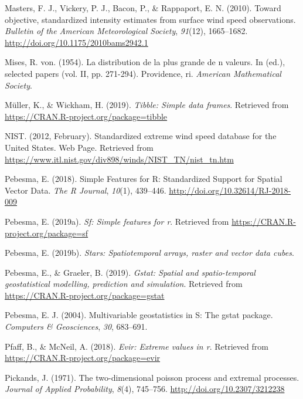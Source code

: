 \documentclass[12pt,oneside]{reedthesis}
\begin{document}
\leavevmode\hypertarget{ref-Masters2010}{}%
Masters, F. J., Vickery, P. J., Bacon, P., \& Rappaport, E. N. (2010). Toward objective, standardized intensity estimates from surface wind speed observations. \emph{Bulletin of the American Meteorological Society}, \emph{91}(12), 1665--1682. \url{http://doi.org/10.1175/2010bams2942.1}

\leavevmode\hypertarget{ref-Mises1954}{}%
Mises, R. von. (1954). La distribution de la plus grande de n valeurs. In (ed.), selected papers (vol. II, pp. 271-294). Providence, ri. \emph{American Mathematical Society}.

\leavevmode\hypertarget{ref-Mueller2019}{}%
Müller, K., \& Wickham, H. (2019). \emph{Tibble: Simple data frames}. Retrieved from \url{https://CRAN.R-project.org/package=tibble}

\leavevmode\hypertarget{ref-nist2012}{}%
NIST. (2012, February). Standardized extreme wind speed database for the United States. Web Page. Retrieved from \url{https://www.itl.nist.gov/div898/winds/NIST_TN/nist_tn.htm}

\leavevmode\hypertarget{ref-Pebesma2018}{}%
Pebesma, E. (2018). Simple Features for R: Standardized Support for Spatial Vector Data. \emph{The R Journal}, \emph{10}(1), 439--446. \url{http://doi.org/10.32614/RJ-2018-009}

\leavevmode\hypertarget{ref-Pebesma2019a}{}%
Pebesma, E. (2019a). \emph{Sf: Simple features for r}. Retrieved from \url{https://CRAN.R-project.org/package=sf}

\leavevmode\hypertarget{ref-Pebesma2019b}{}%
Pebesma, E. (2019b). \emph{Stars: Spatiotemporal arrays, raster and vector data cubes}.

\leavevmode\hypertarget{ref-Pebesma2019}{}%
Pebesma, E., \& Graeler, B. (2019). \emph{Gstat: Spatial and spatio-temporal geostatistical modelling, prediction and simulation}. Retrieved from \url{https://CRAN.R-project.org/package=gstat}

\leavevmode\hypertarget{ref-Pebesma2004}{}%
Pebesma, E. J. (2004). Multivariable geostatistics in S: The gstat package. \emph{Computers \& Geosciences}, \emph{30}, 683--691.

\leavevmode\hypertarget{ref-Pfaff2018}{}%
Pfaff, B., \& McNeil, A. (2018). \emph{Evir: Extreme values in r}. Retrieved from \url{https://CRAN.R-project.org/package=evir}

\leavevmode\hypertarget{ref-Pickands1971}{}%
Pickands, J. (1971). The two-dimensional poisson process and extremal processes. \emph{Journal of Applied Probability}, \emph{8}(4), 745--756. \url{http://doi.org/10.2307/3212238}
\end{document}
